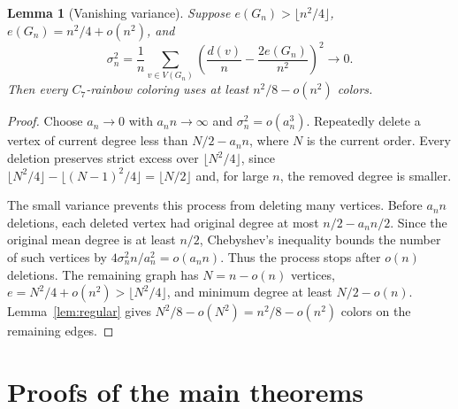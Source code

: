 \documentclass[10pt]{article}
\newtheorem{lem}[thm]{Lemma}
\theoremstyle{remark}
\begin{document}
\begin{lem}[Vanishing variance]\label{lem:variancezero}
Suppose $e(G_n)>\lfloor n^2/4\rfloor$, $e(G_n)=n^2/4+o(n^2)$, and
\[
 \sigma_n^2=\frac1n\sum_{v\in V(G_n)}
 \left(\frac{d(v)}n-\frac{2e(G_n)}{n^2}\right)^2\longrightarrow0.
\]
Then every $C_7$-rainbow coloring uses at least $n^2/8-o(n^2)$ colors.
\end{lem}
\begin{proof}
Choose $a_n\to0$ with $a_nn\to\infty$ and $\sigma_n^2=o(a_n^3)$. Repeatedly delete a vertex of current degree less than $N/2-a_nn$, where $N$ is the current order. Every deletion preserves strict excess over $\lfloor N^2/4\rfloor$, since $\lfloor N^2/4\rfloor-\lfloor (N-1)^2/4\rfloor=\lfloor N/2\rfloor$ and, for large $n$, the removed degree is smaller.

The small variance prevents this process from deleting many vertices. Before $a_nn$ deletions, each deleted vertex had original degree at most $n/2-a_nn/2$. Since the original mean degree is at least $n/2$, Chebyshev's inequality bounds the number of such vertices by $4\sigma_n^2n/a_n^2=o(a_nn)$. Thus the process stops after $o(n)$ deletions. The remaining graph has $N=n-o(n)$ vertices, $e=N^2/4+o(n^2)>\lfloor N^2/4\rfloor$, and minimum degree at least $N/2-o(n)$. Lemma~\ref{lem:regular} gives $N^2/8-o(N^2)=n^2/8-o(n^2)$ colors on the remaining edges.
\end{proof}

\section{Proofs of the main theorems}\label{sec:assembly}
\end{document}
